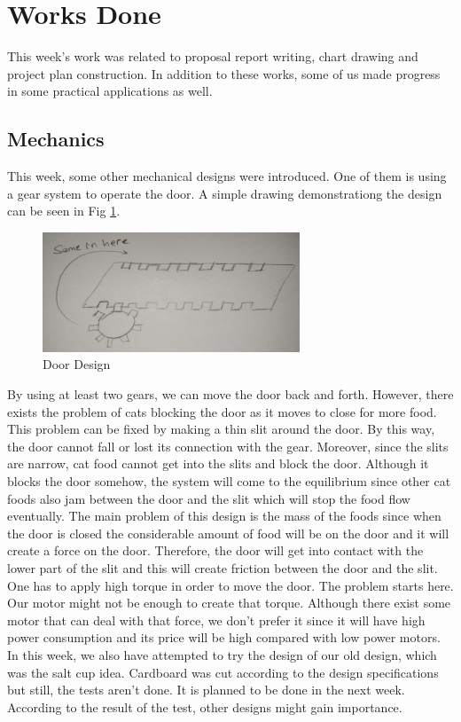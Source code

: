 \section{Works Done}
\label{sec:worksDone}
This week's work was related to proposal report writing, chart drawing and project plan construction. In addition to these works, some of us made progress in some practical applications as well. 
\subsection{Mechanics}
This week, some other mechanical designs were introduced. One of them is using a gear system to operate the door. A simple drawing demonstrationg the design can be seen in Fig \ref{fig:mechDoga1}.

\begin{figure}
    \centering
    \includegraphics{img/mechDoga1.png}
    \caption{Door Design}
    \label{fig:mechDoga1}
\end{figure}

By using at least two gears, we can move the door back and forth. However, there exists the problem of cats blocking the door as it moves to close for more food. This problem can be fixed by making a thin slit around the door. By this way, the door cannot fall or lost its connection with the gear. Moreover, since the slits are narrow, cat food cannot get into the slits and block the door. Although it blocks the door somehow, the system will come to the equilibrium since other cat foods also jam between the door and the slit which will stop the food flow eventually. 
The main problem of this design is the mass of the foods since when the door is closed the considerable amount of food will be on the door and it will create a force on the door. Therefore, the door will get into contact with the lower part of the slit and this will create friction between the door and the slit. One has to apply high torque in order to move the door. The problem starts here. Our motor might not be enough to create that torque. Although there exist some motor that can deal with that force, we don’t prefer it since it will have high power consumption and its price will be high compared with low power motors.
In this week, we also have attempted to try the design of our old design, which was the salt cup idea. Cardboard was cut according to the design specifications but still, the tests aren't done. It is planned to be done in the next week. According to the result of the test, other designs might gain importance.


